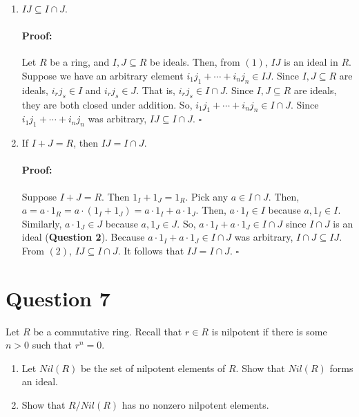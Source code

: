\documentclass [12pt] {article}
\newenvironment{proof}{\paragraph{Proof:}}{\hfill$\square$}
\begin{document}
\begin{enumerate}
\begin{proof}
            ideal. 
        \end{proof}
    \item $IJ \subseteq I \cap J$. 
        \vspace{-1em}
        \begin{proof}
            Let $R$ be a ring, and $I, J \subseteq R$ be ideals. Then, from $(1)$, $IJ$ is an ideal
            in $R$. Suppose we have an arbitrary element $i_1 j_1 + \cdots + i_n j_n \in IJ$. Since 
            $I, J \subseteq R$ are ideals, $i_r j_s \in I$ and $i_r j_s \in J$. That is, 
            $i_r j_s \in I \cap J$. Since $I, J \subseteq R$ are ideals, they are both closed under
            addition. So, $i_1 j_1 + \cdots + i_n j_n \in I \cap J$. Since 
            $i_1 j_1 + \cdots + i_n j_n$ was arbitrary, $IJ \subseteq I \cap J$.
        \end{proof}
    \item If $I+J=R$, then $IJ=I\cap J$.
        \vspace{-1em}
        \begin{proof}
            Suppose $I + J = R$. Then $1_I + 1_J = 1_R$. Pick any $a \in I \cap J$. Then,
            $a = a \cdot 1_R = a \cdot (1_I + 1_J) = a \cdot 1_I + a \cdot 1_J$. Then, 
            $a \cdot 1_I \in I$ because $a, 1_I \in I$. Similarly, $a \cdot 1_J \in J$ 
            because $a, 1_J \in J$. So, $a \cdot 1_I + a \cdot 1_J \in I \cap J$ since $I \cap J$ 
            is an ideal (\textbf{Question 2}). Because $a \cdot 1_I + a \cdot 1_J \in I \cap J$ 
            was arbitrary, $I \cap J \subseteq IJ$. From $(2)$, $IJ \subseteq I \cap J$. It follows 
            that $IJ = I \cap J$.
        \end{proof}
\end{enumerate}
\newpage

\section*{Question 7}
Let $R$ be a commutative ring. Recall that $r\in R$ is nilpotent if there is some $n>0$ such that $r^n=0$. 

\begin{enumerate}
    \item Let $Nil(R)$ be the set of nilpotent elements of $R$. Show that $Nil(R)$ forms an ideal. 

    \item Show that $R/Nil(R)$ has no nonzero nilpotent elements.
\end{enumerate}
\end{document}
